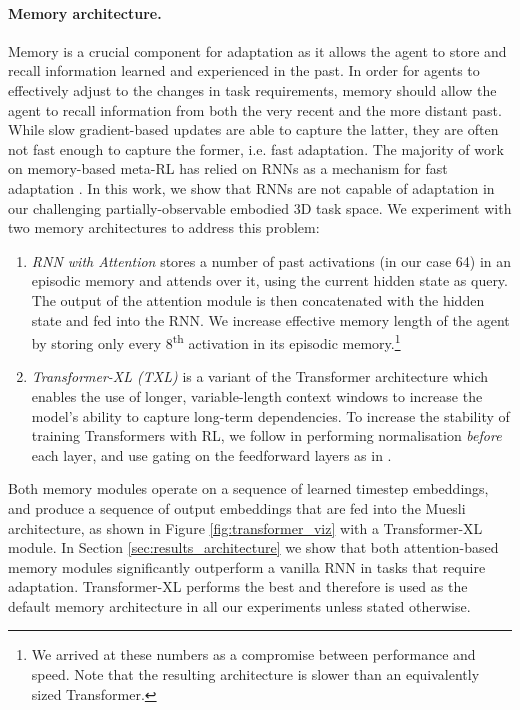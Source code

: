\documentclass[11pt, a4paper, logo, copyright]{deepmind}
\begin{document}
\paragraph{Memory architecture.}
\label{sec:memory-architectures}
Memory is a crucial component for adaptation as it allows the agent to store and recall information learned and experienced in the past. In order for agents to effectively adjust to the changes in task requirements, memory should allow the agent to recall information from both the very recent and the more distant past. While slow gradient-based updates are able to capture the latter, they are often not fast enough to capture the former, i.e. fast adaptation. The majority of work on memory-based meta-RL has relied on RNNs as a mechanism for fast adaptation \citep{parisotto2021meta}. In this work, we show that RNNs are not capable of adaptation in our challenging partially-observable embodied 3D task space. We experiment with two memory architectures to address this problem:
\begin{enumerate}\setlength{\itemsep}{6pt}
\item \emph{RNN with Attention} stores a number of past activations (in our case 64) in an episodic memory and attends over it, using the current hidden state as query. The output of the attention module is then concatenated with the hidden state and fed into the RNN. We increase effective memory length of the agent by storing only every 8\textsuperscript{th} activation in its episodic memory.\footnote{We arrived at these numbers as a compromise between performance and speed. Note that the resulting architecture is slower than an equivalently sized Transformer.}
\item \emph{Transformer-XL (TXL)} \citep{dai2019transformer} is a variant of the Transformer architecture \citep{vaswani2017attention} which enables the use of longer, variable-length context windows to increase the model's ability to capture long-term dependencies. To increase the stability of training Transformers with RL, we follow \citet{parisotto2020stabilizing} in performing  normalisation \textit{before} each layer, and use gating on the feedforward layers as in \citet{shazeer2020glu}.
\end{enumerate}
Both memory modules operate on a sequence of learned timestep embeddings, and produce a sequence of output embeddings that are fed into the Muesli architecture, as shown in Figure \ref{fig:transformer_viz} with a Transformer-XL module. In Section \ref{sec:results_architecture} we show that both attention-based memory modules significantly outperform a vanilla RNN in tasks that require adaptation. Transformer-XL performs the best and therefore is used as the default memory architecture in all our experiments unless stated otherwise.
\end{document}
